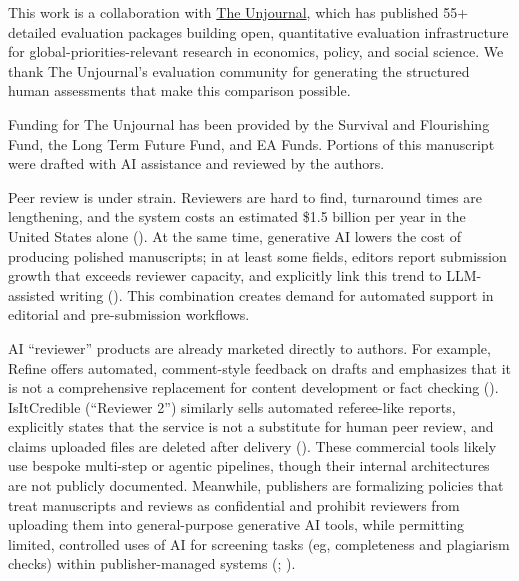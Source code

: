 \documentclass[
  11pt,
  letterpaper,
]{article}
\begin{document}
\begin{tcolorbox}[enhanced jigsaw, left=2mm, colframe=quarto-callout-note-color-frame, bottomrule=.15mm, coltitle=black, leftrule=.75mm, colbacktitle=quarto-callout-note-color!10!white, opacityback=0, arc=.35mm, colback=white, opacitybacktitle=0.6, breakable, title=\textcolor{quarto-callout-note-color}{\faInfo}\hspace{0.5em}{Acknowledgements \& funding}, bottomtitle=1mm, rightrule=.15mm, toprule=.15mm, toptitle=1mm, titlerule=0mm]

This work is a collaboration with \href{https://www.unjournal.org/}{The
Unjournal}, which has published 55+ detailed evaluation packages
building open, quantitative evaluation infrastructure for
global-priorities-relevant research in economics, policy, and social
science. We thank The Unjournal's evaluation community for generating
the structured human assessments that make this comparison possible.

Funding for The Unjournal has been provided by the Survival and
Flourishing Fund, the Long Term Future Fund, and EA Funds. Portions of
this manuscript were drafted with AI assistance and reviewed by the
authors.

\end{tcolorbox}

Peer review is under strain. Reviewers are hard to find, turnaround
times are lengthening, and the system costs an estimated \$1.5 billion
per year in the United States alone
(). At
the same time, generative AI lowers the cost of producing polished
manuscripts; in at least some fields, editors report submission growth
that exceeds reviewer capacity, and explicitly link this trend to
LLM-assisted writing (). This combination creates demand for automated support in
editorial and pre-submission workflows.

AI ``reviewer'' products are already marketed directly to authors. For
example, Refine offers automated, comment-style feedback on drafts and
emphasizes that it is not a comprehensive replacement for content
development or fact checking ().
IsItCredible (``Reviewer 2'') similarly sells automated referee-like
reports, explicitly states that the service is not a substitute for
human peer review, and claims uploaded files are deleted after delivery
(). These commercial
tools likely use bespoke multi-step or agentic pipelines, though their
internal architectures are not publicly documented. Meanwhile,
publishers are formalizing policies that treat manuscripts and reviews
as confidential and prohibit reviewers from uploading them into
general-purpose generative AI tools, while permitting limited,
controlled uses of AI for screening tasks (eg, completeness and
plagiarism checks) within publisher-managed systems
(;
).
\end{document}
